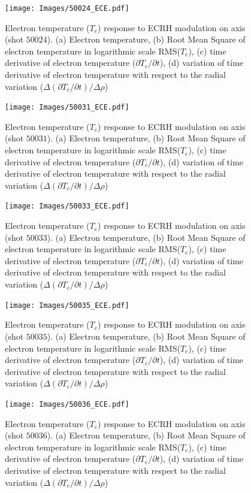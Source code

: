 \documentclass[preprint,12pt,authoryear]{elsarticle}
\begin{document}
\begin{figure}[!ht]

   \texttt{[image: Images/50024\_ECE.pdf]}
   \caption{Electron temperature ($T_e$) response to ECRH modulation on axis (shot $50024$). (a) Electron temperature, (b) Root Mean Square of electron temperature in logarithmic scale RMS($T_e$), (c) time derivative of electron temperature ($\partial T_e /\partial t $), (d) variation of time derivative of electron temperature with respect to the radial variation ($\Delta(\partial T_e /\partial t)/\Delta \rho $)}
   \label{Fig:50024_ECE}
\end{figure}

\begin{figure}[!ht]
   \texttt{[image: Images/50031\_ECE.pdf]}
   \caption{Electron temperature ($T_e$) response to ECRH modulation on axis (shot $50031$). (a) Electron temperature, (b) Root Mean Square of electron temperature in logarithmic scale RMS($T_e$), (c) time derivative of electron temperature ($\partial T_e /\partial t $), (d) variation of time derivative of electron temperature with respect to the radial variation ($\Delta(\partial T_e /\partial t)/\Delta \rho $)}
   \label{Fig:50031_ECE}
\end{figure}

\begin{figure}[!ht]
   \texttt{[image: Images/50033\_ECE.pdf]}
   \caption{Electron temperature ($T_e$) response to ECRH modulation on axis (shot $50033$). (a) Electron temperature, (b) Root Mean Square of electron temperature in logarithmic scale RMS($T_e$), (c) time derivative of electron temperature ($\partial T_e /\partial t $), (d) variation of time derivative of electron temperature with respect to the radial variation ($\Delta(\partial T_e /\partial t)/\Delta \rho $)}
   \label{Fig:50033_ECE}
\end{figure}

\begin{figure}[!ht]
   \texttt{[image: Images/50035\_ECE.pdf]}
   \caption{Electron temperature ($T_e$) response to ECRH modulation on axis (shot $50035$). (a) Electron temperature, (b) Root Mean Square of electron temperature in logarithmic scale RMS($T_e$), (c) time derivative of electron temperature ($\partial T_e /\partial t $), (d) variation of time derivative of electron temperature with respect to the radial variation ($\Delta(\partial T_e /\partial t)/\Delta \rho $)}
   \label{Fig:50035_ECE}
\end{figure}

\begin{figure}[!ht]
   \texttt{[image: Images/50036\_ECE.pdf]}
   \caption{Electron temperature ($T_e$) response to ECRH modulation on axis (shot $50036$). (a) Electron temperature, (b) Root Mean Square of electron temperature in logarithmic scale RMS($T_e$), (c) time derivative of electron temperature ($\partial T_e /\partial t $), (d) variation of time derivative of electron temperature with respect to the radial variation ($\Delta(\partial T_e /\partial t)/\Delta \rho $)}
   \label{Fig:50036_ECE}
\end{figure}


\clearpage




\end{document}
